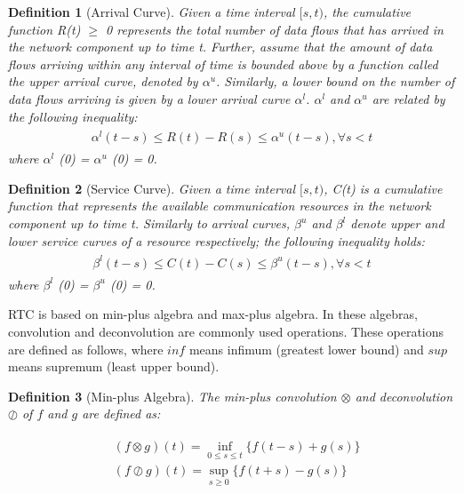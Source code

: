 \documentclass[electronics,article,accept,moreauthors,pdftex]{Definitions/mdpi}
\newtheorem{myDef}{Definition}
\begin{document}
\begin{myDef}[Arrival Curve]
 Given a time interval $[s,t)$, the cumulative function R(t) $\geq$ 0 represents the total number of data flows that has arrived in the network component up to time t. Further, assume that the amount of data flows arriving within any interval of time is bounded above by a function called the upper arrival curve, denoted by $\alpha^u$. Similarly, a lower bound on the number of data flows arriving is given by a lower arrival curve $\alpha^l$. $\alpha^l$ and $\alpha^u$ are related by the following inequality:
\begin{gather}
\begin{align}
	\alpha^l (t-s) \leq R(t) - R(s) \leq \alpha^u (t-s),\forall s<t %
\end{align}
\end{gather}
where $\alpha^l$ (0) = $\alpha^u$ (0) = 0.
\end{myDef}

\begin{myDef}[Service Curve]
Given a time interval $[s,t)$, C(t) is a cumulative function that represents the available communication resources in the network component up to time t. Similarly to arrival curves, $\beta^u$ and $\beta^l$ denote upper and lower service curves of a resource respectively; the following inequality holds:
\begin{gather}
\begin{align}
	\beta^l (t-s) \leq C(t) - C(s) \leq \beta^u (t-s),\forall s<t %
\end{align}
\end{gather}
where $\beta^l$ (0) = $\beta^u$ (0) = 0.
\end{myDef}

RTC is based on min-plus algebra and max-plus algebra. In these algebras, convolution and deconvolution are commonly used operations. These operations are defined as follows, where $inf$ means infimum (greatest lower bound) and $sup$ means supremum (least upper bound).

\begin{myDef}[Min-plus Algebra]
The min-plus convolution $\otimes$ and deconvolution $\oslash$ of $f$ and $g$ are defined as:

\begin{gather}
\begin{align}
 	&(f\otimes g)(t) = \inf_{0\leq s\leq t}\{f(t-s)+g(s)\}\\
 	&(f\oslash g)(t) = \sup_{s \ge 0}\{f(t+s)-g(s)\}
\end{align}
\end{gather}
\end{myDef}
\end{document}
